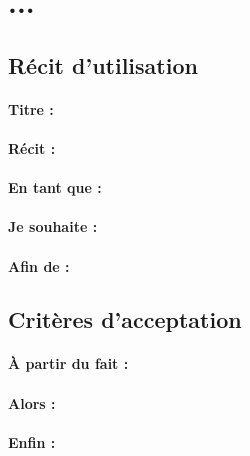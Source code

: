 \section{...} %

\subsection*{Récit d'utilisation}

\paragraph{Titre : } %
\paragraph{Récit : } %
\paragraph{En tant que : } %
\paragraph{Je souhaite : } %
\paragraph{Afin de : } %

\subsection*{Critères d'acceptation}

\paragraph{À partir du fait : } %
\paragraph{Alors : } %
\paragraph{Enfin : } %
